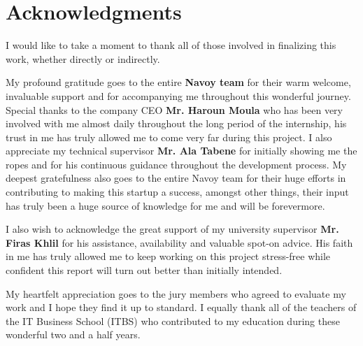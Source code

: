 \section*{Acknowledgments}
I would like to take a moment to thank all of those involved in finalizing this work, whether directly or indirectly.

My profound gratitude goes to the entire \textbf{Navoy team} for their warm welcome, invaluable support and for accompanying me throughout this wonderful journey.
Special thanks to the company CEO \textbf{Mr. Haroun Moula} who has been very involved with me almost daily throughout the long period of the internship, his trust in me has truly allowed me to come very far during this project.
I also appreciate my technical supervisor \textbf{Mr. Ala Tabene} for initially showing me the ropes and for his continuous guidance throughout the development process.
My deepest gratefulness also goes to the entire Navoy team for their huge efforts in contributing to making this startup a success, amongst other things, their input has truly been a huge source of knowledge for me and will be forevermore.

I also wish to acknowledge the great support of my university supervisor \textbf{Mr. Firas Khlil} for his assistance, availability and valuable spot-on advice.
His faith in me has truly allowed me to keep working on this project stress-free while confident this report will turn out better than initially intended.

My heartfelt appreciation goes to the jury members who agreed to evaluate my work and I hope they find it up to standard.
I equally thank all of the teachers of the IT Business School
(ITBS) who contributed to my education during these wonderful two and a half years.

\newpage
